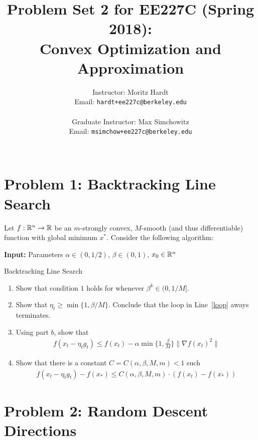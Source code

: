 \documentclass[12pt]{article}
\title{Problem Set 2 for EE227C (Spring 2018):\\
 Convex Optimization and Approximation }
\author{Instructor: Moritz Hardt\\
{\small Email: \tt hardt+ee227c@berkeley.edu}\\ ~\\
Graduate Instructor: Max Simchowitz\\
{\small Email: \tt msimchow+ee227c@berkeley.edu}\\ ~\\
}
\begin{document}


\maketitle

\section*{Problem 1: Backtracking Line Search}
	Let $f: \mathbb{R}^n \to \mathbb{R}$ be an $m$-strongly convex, $M$-smooth (and thus differentiable) function with global minimum $x^*$. Consider the following algorithm: 

	\begin{algorithm}[H]
	\SetAlgoLined
	\textbf{Input:} Parameters $\alpha \in (0,1/2)$, $\beta \in (0,1)$, $x_0 \in \mathbb{R}^n$\;
	\caption{Backtracking Line Search}
	\end{algorithm}

	\begin{enumerate}
		\item Show that condition $1$ holds for whenever $\beta^k \in (0,1/M]$.
		\item Show that $\eta_t \ge \min\{1,\beta/M\}$. 
		 Conclude that the loop in Line~\ref{loop} aways terminates.
		\item Using part $b$, show that 
		\begin{eqnarray}
		f(x_t - \eta_t g_t) \le f(x_t) - \alpha \min\{1,\frac{\beta}{M}\}\|\nabla f(x_t)^2\|
		\end{eqnarray}
		\item Show that there is a constant $C = C(\alpha,\beta,M,m) < 1$ such 
		\begin{eqnarray}
		f(x_t - \eta_t g_t) - f(x_*) \le C(\alpha,\beta,M,m) \cdot (f(x_t) - f(x_*))
		\end{eqnarray}
	\end{enumerate}


\section*{Problem 2: Random Descent Directions}
\end{document}
